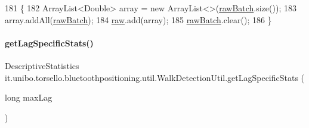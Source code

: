 \begin{DoxyCode}
181                                       \{
182         ArrayList<Double> array = \textcolor{keyword}{new} ArrayList<>(\hyperlink{classit_1_1unibo_1_1torsello_1_1bluetoothpositioning_1_1util_1_1WalkDetectionUtil_a47aa197c142093f82c9f2acefd0a6af3_a47aa197c142093f82c9f2acefd0a6af3}{rawBatch}.size());
183         array.addAll(\hyperlink{classit_1_1unibo_1_1torsello_1_1bluetoothpositioning_1_1util_1_1WalkDetectionUtil_a47aa197c142093f82c9f2acefd0a6af3_a47aa197c142093f82c9f2acefd0a6af3}{rawBatch});
184         \hyperlink{classit_1_1unibo_1_1torsello_1_1bluetoothpositioning_1_1util_1_1WalkDetectionUtil_a985270e2b9d4202985cb987eef136a9e_a985270e2b9d4202985cb987eef136a9e}{raw}.add(array);
185         \hyperlink{classit_1_1unibo_1_1torsello_1_1bluetoothpositioning_1_1util_1_1WalkDetectionUtil_a47aa197c142093f82c9f2acefd0a6af3_a47aa197c142093f82c9f2acefd0a6af3}{rawBatch}.clear();
186     \}
\end{DoxyCode}
\hypertarget{classit_1_1unibo_1_1torsello_1_1bluetoothpositioning_1_1util_1_1WalkDetectionUtil_ac4c75fb869a8a9cc6994c8e1e55af955_ac4c75fb869a8a9cc6994c8e1e55af955}{}\label{classit_1_1unibo_1_1torsello_1_1bluetoothpositioning_1_1util_1_1WalkDetectionUtil_ac4c75fb869a8a9cc6994c8e1e55af955_ac4c75fb869a8a9cc6994c8e1e55af955} 
\paragraph{\texorpdfstring{get\+Lag\+Specific\+Stats()}{getLagSpecificStats()}}
{\footnotesize\ttfamily Descriptive\+Statistics it.\+unibo.\+torsello.\+bluetoothpositioning.\+util.\+Walk\+Detection\+Util.\+get\+Lag\+Specific\+Stats (\begin{DoxyParamCaption}\item[{long}]{max\+Lag }\end{DoxyParamCaption})\hspace{0.3cm}{\ttfamily [private]}}



